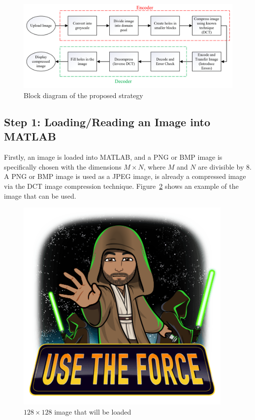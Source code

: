\documentclass[10pt,twocolumn]{witseiepaper}
\begin{document}
\begin{figure}[h!]
\renewcommand{\thefigure}{\arabic{figure}}
\hspace{-0.5cm}
\includegraphics[scale=0.16]{BlockDiagram.png}
\caption{Block diagram of the proposed strategy}
\label{fig: Block Diagram}
\end{figure}

\subsection{Step 1: Loading/Reading an Image into MATLAB}
\label{sec: Step 1}
Firstly, an image is loaded into MATLAB, and a PNG or BMP image is specifically chosen with the dimensions $M\times N$, where $M$ and $N$ are divisible by 8. A PNG or BMP image is used as a JPEG image, is already a compressed image via the DCT image compression technique. Figure~\ref{fig: Step 1} shows an example of the image that can be used. 
\begin{figure}[h!]
\renewcommand{\thefigure}{\arabic{figure}}
\centering
\includegraphics[scale=0.3, frame]{Step1.png}
\caption{$128\times 128$ image that will be loaded}
\label{fig: Step 1}
\end{figure}
\end{document}
